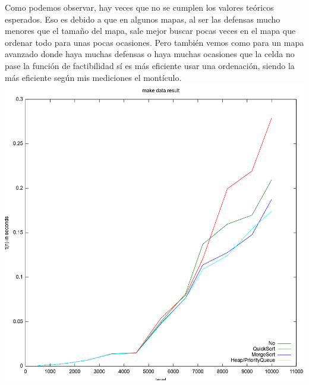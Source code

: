Como podemos observar, hay veces que no se cumplen los valores teóricos esperados. Eso es debido a que en algunos mapas, al ser las defensas mucho menores que el tamaño del mapa, sale mejor buscar pocas veces en el mapa que ordenar todo para unas pocas ocasiones.
Pero también vemos como para un mapa avanzado donde haya muchas defensas o haya muchas ocasiones que la celda no pase la función de factibilidad sí es más eficiente usar una ordenación, siendo la más eficiente según mis mediciones el montículo.\\

\includegraphics[width=\linewidth]{image.png}